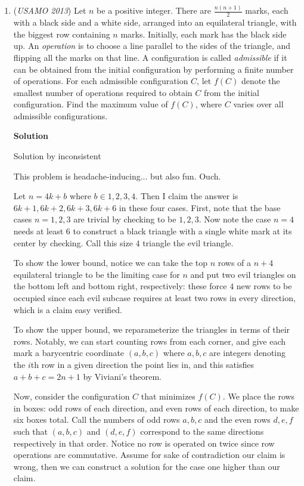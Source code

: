 \begin{enumerate}
	\item (\textit{USAMO 2013}) Let $n$ be a positive integer.  There are $\frac{n(n+1)}{2}$ marks, each with a black side and a white side, arranged into an equilateral triangle, with the biggest row containing $n$ marks.  Initially, each mark has the black side up.  An \textit{operation} is to choose a line parallel to the sides of the triangle, and flipping all the marks on that line.  A configuration is called \textit{admissible} if it can be obtained from the initial configuration by performing a finite number of operations.  For each admissible configuration $C$, let $f(C)$ denote the smallest number of operations required to obtain $C$ from the initial configuration.  Find the maximum value of $f(C)$, where $C$ varies over all admissible configurations.


 



\textbf{Solution}

Solution by inconsistent 

 
This problem is headache-inducing... but also fun. Ouch.

 Let $n = 4k + b$ where $b \in {1, 2, 3, 4}$. Then I claim the answer is $6k+1, 6k+2, 6k+3, 6k+6$ in these four cases. First, note that the base cases $n = 1, 2, 3$ are trivial by checking to be $1, 2, 3$. Now note the case $n = 4$ needs at least $6$ to construct a black triangle with a single white mark at its center by checking. Call this size $4$ triangle the evil triangle.

 To show the lower bound, notice we can take the top $n$ rows of a $n+4$ equilateral triangle to be the limiting case for $n$ and put two evil triangles on the bottom left and bottom right, respectively: these force $4$ new rows to be occupied since each evil subcase requires at least two rows in every direction, which is a claim easy verified.

 To show the upper bound, we reparameterize the triangles in terms of their rows. Notably, we can start counting rows from each corner, and give each mark a barycentric coordinate $(a, b, c)$ where $a, b, c$ are integers denoting the $i$th row in a given direction the point lies in, and this satisfies $a+b+c = 2n+1$ by Viviani's theorem.

 Now, consider the configuration $C$ that minimizes $f(C)$. We place the rows in boxes: odd rows of each direction, and even rows of each direction, to make six boxes total. Call the numbers of odd rows $a, b, c$ and the even rows $d, e, f$ such that $(a, b, c)$ and $(d, e, f)$ correspond to the same directions respectively in that order. Notice no row is operated on twice since row operations are commutative. Assume for sake of contradiction our claim is wrong, then we can construct a solution for the case one higher than our claim.


\end{enumerate}
